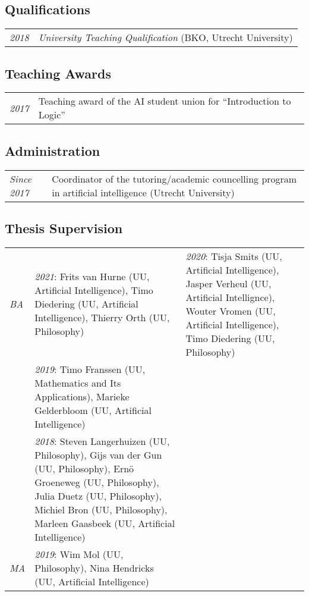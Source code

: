\subsection*{Qualifications}

\begin{tabular}{l p{\linewidth}}
  \emph{2018} & \emph{University Teaching Qualification} (BKO, Utrecht University)
\end{tabular}

\subsection*{Teaching Awards}

\begin{tabular}{p{.1\linewidth} l}
  \emph{2017} & Teaching award of the AI student union for ``Introduction to Logic''
\end{tabular}

\subsection*{Administration}
	
\begin{tabular}{p{.15\linewidth} p{.8\linewidth}}
  \emph{Since 2017} & Coordinator of the tutoring/academic councelling program in artificial intelligence (Utrecht University)\\
\end{tabular}

\subsection*{Thesis Supervision}

\begin{tabular}{p{.1\linewidth} p{.8\linewidth}}
  \emph{BA}  & \emph{2021}: Frits van Hurne (UU, Artificial Intelligence),
                            Timo Diedering (UU, Artificial Intelligence),
                            Thierry Orth (UU, Philosophy)

             & \emph{2020}: Tisja Smits (UU, Artificial Intelligence),
                            Jasper Verheul (UU, Artificial Intellignce),
                            Wouter Vromen (UU, Artificial Intelligence),
                            Timo Diedering (UU, Philosophy)\\
             & \emph{2019}: Timo Franssen (UU, Mathematics and Its
                            Applications), Marieke Gelderbloom (UU, Artificial Intelligence)\\
             & \emph{2018}: Steven Langerhuizen (UU, Philosophy), Gijs van der
                            Gun (UU, Philosophy), Ern\"o Groeneweg (UU, Philosophy), Julia Duetz (UU,
                            Philosophy), Michiel Bron (UU, Philosophy), Marleen Gaasbeek (UU, Artificial
                            Intelligence)\\[1ex]
  \emph{MA}  & \emph{2019}: Wim Mol (UU, Philosophy), Nina Hendricks (UU, Artificial Intelligence)\\
\end{tabular}


